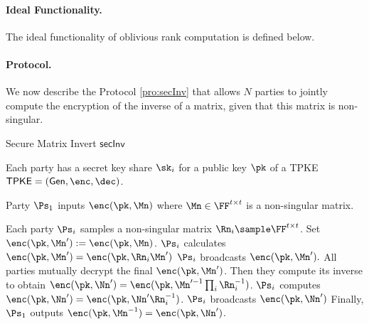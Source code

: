  \paragraph{Ideal Functionality.} The ideal functionality of oblivious rank computation is defined below. 
 \begin{center}
\end{center}

\paragraph{Protocol.} We now describe the Protocol \ref{pro:secInv} that allows $N$ parties to jointly compute the encryption of the inverse of a matrix, given that this matrix is non-singular.
  
 
  
\begin{algorithm}
\caption{Secure Matrix Invert $\mathsf{secInv}$}
\label{pro:secInv}
\begin{algorithmic}[1]
\REQUIRE Each party has a secret key share $\sk_i$ for a public key $\pk$ of a TPKE $\mathsf{TPKE}=(\mathsf{Gen},\enc,\dec)$.

\ENSURE Party $\Ps_1$ inputs $\enc(\pk,\Mn)$ where $\Mn\in\FF^{t\times t}$ is a non-singular matrix.

\STATE  Each party $\Ps_i$ samples a non-singular matrix $\Rn_i\sample\FF^{t\times t}$.
\STATE  Set $\enc(\pk,\Mn'):=\enc(\pk,\Mn)$.
    \STATE $\Ps_i$ calculates $\enc(\pk,\Mn')=\enc(\pk,\Rn_i\Mn')$
    \STATE $\Ps_i$ broadcasts $\enc(\pk,\Mn').$ %
\ENDFOR
\STATE All parties mutually decrypt the final $\enc(\pk,\Mn')$. Then they compute its inverse to obtain $\enc(\pk,\Nn')=\enc(\pk,\Mn'^{-1}\prod_i\Rn_i^{-1})$.
    \STATE $\Ps_i$ computes $\enc(\pk,\Nn')=\enc(\pk,\Nn'\Rn_i^{-1})$. 
    \STATE $\Ps_i$ broadcasts $\enc(\pk,\Nn')$ %
\ENDFOR
\STATE Finally, $\Ps_1$ outputs $\enc(\pk,\Mn^{-1})=\enc(\pk,\Nn')$.
\end{algorithmic}
\end{algorithm}
  
